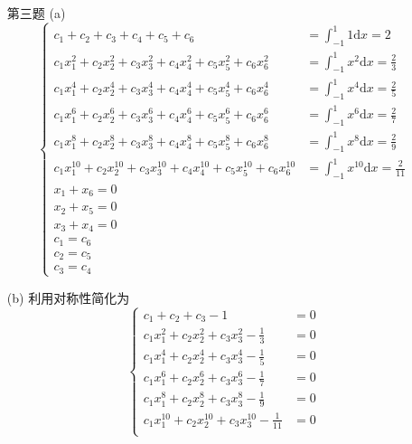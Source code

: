 \documentclass[12pt,a4paper,utf8]{ctexart}
\begin{document}
\begin{enumerate}
\item[第三题]
\subitem(a)
\begin{equation}
    \left\{\begin{array}{ll}
        c_1+c_2+c_3+c_4+c_5+c_6 &= \int_{-1}^1 1 \mathrm{d}x = 2\\
        c_1 x_1^2 + c_2 x_2^2 + c_3 x_3^2 + c_4 x_4^2 + c_5 x_5^2 + c_6 x_6^2 &= \int_{-1}^1 x^2 \mathrm{d}x = \frac{2}{3}\\
        c_1 x_1^4 + c_2 x_2^4 + c_3 x_3^4 + c_4 x_4^4 + c_5 x_5^4 + c_6 x_6^4 &= \int_{-1}^1 x^4 \mathrm{d}x = \frac{2}{5}\\
        c_1 x_1^6 + c_2 x_2^6 + c_3 x_3^6 + c_4 x_4^6 + c_5 x_5^6 + c_6 x_6^6 &= \int_{-1}^1 x^6 \mathrm{d}x = \frac{2}{7}\\
        c_1 x_1^8 + c_2 x_2^8 + c_3 x_3^8 + c_4 x_4^8 + c_5 x_5^8 + c_6 x_6^8 &= \int_{-1}^1 x^8 \mathrm{d}x = \frac{2}{9}\\
        c_1 x_1^{10} + c_2 x_2^{10} + c_3 x_3^{10} + c_4 x_4^{10} + c_5 x_5^{10} + c_6 x_6^{10} &= \int_{-1}^1 x^{10} \mathrm{d}x = \frac{2}{11}\\
        x_1 + x_6 = 0 \\
        x_2 + x_5 = 0 \\
        x_3 + x_4 = 0 \\
        c_1 = c_6 \\
        c_2 = c_5 \\
        c_3 = c_4
    \end{array}\right.
\end{equation}

\subitem(b)
利用对称性简化为
\begin{equation}
    \left\{\begin{array}{ll}
        c_1+c_2+c_3-1 &= 0\\
        c_1 x_1^2 + c_2 x_2^2 + c_3 x_3^2 - \frac{1}{3} &= 0\\
        c_1 x_1^4 + c_2 x_2^4 + c_3 x_3^4 - \frac{1}{5} &= 0\\
        c_1 x_1^6 + c_2 x_2^6 + c_3 x_3^6 - \frac{1}{7} &= 0\\
        c_1 x_1^8 + c_2 x_2^8 + c_3 x_3^8 - \frac{1}{9} &= 0\\
        c_1 x_1^{10} + c_2 x_2^{10} + c_3 x_3^{10} - \frac{1}{11} &= 0\\
    \end{array}\right.
\end{equation}


\end{enumerate}
\end{document}
